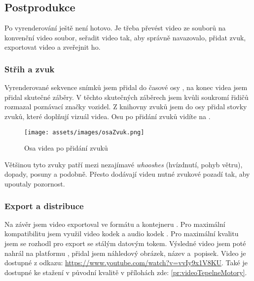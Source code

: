 \subsection{Postprodukce}
Po vyrenderování ještě není hotovo. Je třeba převést video ze souborů  na konvenční video soubor, seřadit video tak, aby správně navazovalo, přidat zvuk, exportovat video a zveřejnit ho.
\subsubsection{Střih a zvuk}
{Vyrenderované sekvence snímků jsem přidal do časové osy , na konec videa jsem přidal skutečné záběry. V těchto skutečných záběrech jsem kvůli soukromí řidičů rozmazal poznávací značky vozidel.}\odst
{Z knihovny zvuků  jsem do osy přidal stovky zvuků, které doplňují vizuál videa. Osu po přidání zvuků vidíte na .}
\begin{figure}[H]
    \centering
    \texttt{[image: assets/images/osaZvuk.png]}
    \caption{Osa videa po přidání zvuků \jaObr}
    \label{obr:osaZvuk}
\end{figure}
{Většinou tyto zvuky patří mezi nezajímavé \textit{whooshes} (hvízdnutí, pohyb větru), dopady, posuny a podobně. Přesto dodávají videu nutné zvukové pozadí tak, aby upoutaly pozornost.}
\subsubsection{Export a distribuce}
{Na závěr jsem video exportoval ve formátu  a kontejneru . Pro maximální kompatibilitu jsem využil video kodek  a audio kodek . Pro maximální kvalitu jsem se rozhodl pro export se stálým datovým tokem.}\odst
{Výsledné video jsem poté nahrál na platformu , přidal jsem náhledový obrázek, název a~popisek. Video je dostupné z odkazu: \href{https://www.youtube.com/watch?v=vvIy9x1V8KU}{https://www.youtube.com/watch?v=vvIy9x1V8KU}. Také je dostupné ke stažení v původní kvalitě v přílohách zde: \ref{pr:videoTepelneMotory}.}